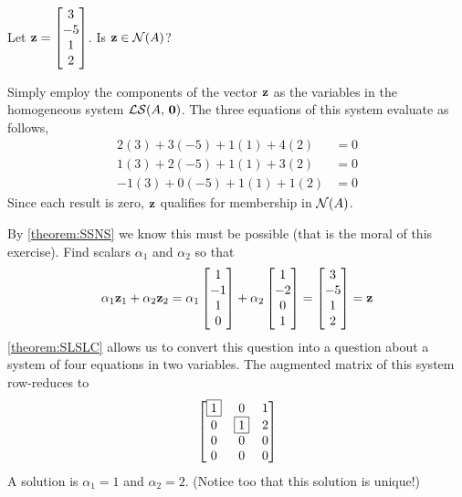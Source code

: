 \documentclass{ximera}
\begin{document}
\begin{exercise}
  \begin{question}
    Let $\mathbf{z}=\begin{bmatrix}3 \\ -5 \\ 1 \\ 2\end{bmatrix}$.  Is $\mathbf{z} \in \mathcal{N}\!\left(A\right)$?

    \begin{multipleChoice}
    \end{multipleChoice}

    \begin{feedback}[correct]
      Simply employ the components of the vector $\mathbf{z}$ as the variables in the homogeneous system $\mathcal{LS}\!\left(A,\,\mathbf{0}\right)$.  The three equations of this system evaluate as follows,
      \begin{align*}
        2(3) + 3(-5)+ 1(1) + 4(2)&=0 \\
        1(3) + 2(-5)+ 1(1) + 3(2)&= 0\\
        -1(3) + 0(-5)+ 1(1) + 1(2)&=0
      \end{align*}
      Since each result is zero, $\mathbf{z}$ qualifies for membership in $\mathcal{N}\!\left(A\right)$.
      
      By \ref{theorem:SSNS} we know this must be possible (that is the moral of this exercise).  Find scalars $\alpha_1$ and $\alpha_2$ so that
      \[
        \alpha_1\mathbf{z}_1+\alpha_2\mathbf{z}_2
        =
        \alpha_1\begin{bmatrix}1\\-1\\1\\0\end{bmatrix}+\alpha_2\begin{bmatrix}1\\-2\\0\\1\end{bmatrix}
        =
        \begin{bmatrix}3 \\ -5 \\ 1 \\ 2\end{bmatrix}
        =
        \mathbf{z}
      \]
      \ref{theorem:SLSLC} allows us to convert this question into a question about a system of four equations in two variables.  The augmented matrix of this system row-reduces to
      \[
        \begin{bmatrix}
          \fbox{1} & 0 & 1 \\
          0 & \fbox{1} & 2 \\
          0 & 0 & 0 \\
          0 & 0 & 0
        \end{bmatrix}
      \]
      A solution is $\alpha_1=1$ and $\alpha_2=2$.  (Notice too that this solution is unique!)
    \end{feedback}
  \end{question}
\end{exercise}
\end{document}
